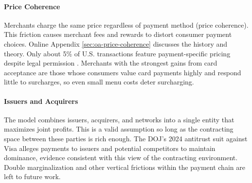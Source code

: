 \documentclass[main.tex]{subfiles}
\begin{document}
\paragraph{Price Coherence}
\label{subsec:surcharging-institutional}
Merchants charge the same price regardless of payment method (price coherence).
This friction causes merchant fees and rewards to distort consumer payment choices.
Online Appendix \ref{sec:oa-price-coherence} discusses the history and theory.
Only about 5\% of U.S. transactions feature payment-specific pricing despite legal permission \parencite{Stavins2018}.
Merchants with the strongest gains from card acceptance are those whose consumers value card payments highly and respond little to surcharges, so even small menu costs deter surcharging.

\paragraph{Issuers and Acquirers}
The model combines issuers, acquirers, and networks into a single entity that maximizes joint profits.
This is a valid assumption so long as the contracting space between these parties is rich enough.
The DOJ's 2024 antitrust suit against Visa alleges payments to issuers and potential competitors to maintain dominance, evidence consistent with this view of the contracting environment.
Double marginalization and other vertical frictions within the payment chain are left to future work.
\end{document}

